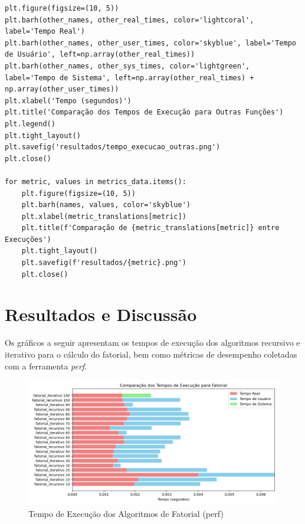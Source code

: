 \documentclass[12pt]{article}
\begin{document}
\begin{verbatim}
plt.figure(figsize=(10, 5))
plt.barh(other_names, other_real_times, color='lightcoral', label='Tempo Real')
plt.barh(other_names, other_user_times, color='skyblue', label='Tempo de Usuário', left=np.array(other_real_times))
plt.barh(other_names, other_sys_times, color='lightgreen', label='Tempo de Sistema', left=np.array(other_real_times) + np.array(other_user_times))
plt.xlabel('Tempo (segundos)')
plt.title('Comparação dos Tempos de Execução para Outras Funções')
plt.legend()
plt.tight_layout()
plt.savefig('resultados/tempo_execucao_outras.png')
plt.close()

for metric, values in metrics_data.items():
    plt.figure(figsize=(10, 5))
    plt.barh(names, values, color='skyblue')
    plt.xlabel(metric_translations[metric])
    plt.title(f'Comparação de {metric_translations[metric]} entre Execuções')
    plt.tight_layout()
    plt.savefig(f'resultados/{metric}.png')
    plt.close()

\end{verbatim}

\newpage

\section{Resultados e Discussão}
Os gráficos a seguir apresentam os tempos de execução dos algoritmos recursivo e iterativo para o cálculo do fatorial, bem como métricas de desempenho coletadas com a ferramenta \textit{perf}.

\begin{figure}[H]
    \centering
    \includegraphics[width=\linewidth]{resultados/tempo_execucao_fatorial.png}
    \caption{Tempo de Execução dos Algoritmos de Fatorial (perf)}
    \label{fig:tempo_execucao}
\end{figure}
\end{document}
